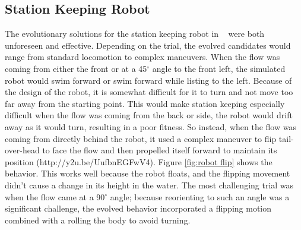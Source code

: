\documentclass{sig-alternate}
\begin{document}
\subsection{Station Keeping Robot}\label{Moore behavior}
  The evolutionary solutions for the station keeping robot in ~\cite{Moore:2013:ESK:2463372.2463402} were both unforeseen and effective. Depending on the trial, the evolved candidates would range from standard locomotion to complex maneuvers. When the flow was coming from either the front or at a 45$^\circ$ angle to the front left, the simulated robot would swim forward or swim forward while listing to the left. Because of the design of the robot, it is somewhat difficult for it to turn and not move too far away from the starting point. This would make station keeping especially difficult when the flow was coming from the back or side, the robot would drift away as it would turn, resulting in a poor fitness. So instead, when the flow was coming from directly behind the robot, it used a complex maneuver to flip tail-over-head to face the flow and then propelled itself forward to maintain its position (http://y2u.be/UufbnEGFwV4). Figure \ref{fig:robot flip} shows the behavior. This works well because the robot floats, and the flipping movement didn't cause a change in its height in the water. The most challenging trial was when the flow came at a 90$^\circ$ angle; because reorienting to such an angle was a significant challenge, the evolved behavior incorporated a flipping motion combined with a rolling the body to avoid turning.
 
\end{document}
